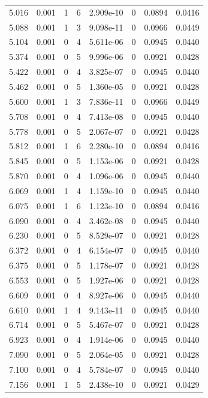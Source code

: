 \documentclass[preview]{standalone}
\begin{document}
{{{\begin{tabular}{L{1.2cm}C{1.2cm} C{0.3cm}C{0.5cm} C{1.4cm}C{1.4cm} C{1.4cm}C{1.4cm}}
  5.016  &  0.001  & 1     &  6 &  2.909e-10  & 0  & 0.0894 &  0.0416   \\ 
  5.088  &  0.001  & 1     &  3 &  9.098e-11  & 0  & 0.0966 &  0.0449   \\ 
  5.104  &  0.001  & 0     &  4 &  5.611e-06  & 0  & 0.0945 &  0.0440   \\ 
  5.374  &  0.001  & 0     &  5 &  9.996e-06  & 0  & 0.0921 &  0.0428   \\ 
  5.422  &  0.001  & 0     &  4 &  3.825e-07  & 0  & 0.0945 &  0.0440   \\ 
  5.462  &  0.001  & 0     &  5 &  1.360e-05  & 0  & 0.0921 &  0.0428   \\ 
  5.600  &  0.001  & 1     &  3 &  7.836e-11  & 0  & 0.0966 &  0.0449   \\ 
  5.708  &  0.001  & 0     &  4 &  7.413e-08  & 0  & 0.0945 &  0.0440   \\ 
  5.778  &  0.001  & 0     &  5 &  2.067e-07  & 0  & 0.0921 &  0.0428   \\ 
  5.812  &  0.001  & 1     &  6 &  2.280e-10  & 0  & 0.0894 &  0.0416   \\ 
  5.845  &  0.001  & 0     &  5 &  1.153e-06  & 0  & 0.0921 &  0.0428   \\ 
  5.870  &  0.001  & 0     &  4 &  1.096e-06  & 0  & 0.0945 &  0.0440   \\ 
  6.069  &  0.001  & 1     &  4 &  1.159e-10  & 0  & 0.0945 &  0.0440   \\ 
  6.075  &  0.001  & 1     &  6 &  1.123e-10  & 0  & 0.0894 &  0.0416   \\ 
  6.090  &  0.001  & 0     &  4 &  3.462e-08  & 0  & 0.0945 &  0.0440   \\ 
  6.230  &  0.001  & 0     &  5 &  8.529e-07  & 0  & 0.0921 &  0.0428   \\ 
  6.372  &  0.001  & 0     &  4 &  6.154e-07  & 0  & 0.0945 &  0.0440   \\ 
  6.375  &  0.001  & 0     &  5 &  1.178e-07  & 0  & 0.0921 &  0.0428   \\ 
  6.553  &  0.001  & 0     &  5 &  1.927e-06  & 0  & 0.0921 &  0.0428   \\ 
  6.609  &  0.001  & 0     &  4 &  8.927e-06  & 0  & 0.0945 &  0.0440   \\ 
  6.610  &  0.001  & 1     &  4 &  9.143e-11  & 0  & 0.0945 &  0.0440   \\ 
  6.714  &  0.001  & 0     &  5 &  5.467e-07  & 0  & 0.0921 &  0.0428   \\ 
  6.923  &  0.001  & 0     &  4 &  1.914e-06  & 0  & 0.0945 &  0.0440   \\ 
  7.090  &  0.001  & 0     &  5 &  2.064e-05  & 0  & 0.0921 &  0.0428   \\ 
  7.100  &  0.001  & 0     &  4 &  5.784e-07  & 0  & 0.0945 &  0.0440   \\ 
  7.156  &  0.001  & 1     &  5 &  2.438e-10  & 0  & 0.0921 &  0.0429   \\ 
\hline 
\end{tabular} 

}}}
\end{document}
